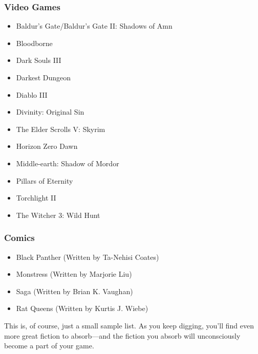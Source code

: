 \documentclass[10pt,a4paper,twoside,bg=print,twocolumn,openany,nodeprecatedcode]{dndbook}
\begin{document}
\subsubsection{Video Games}

\begin{itemize}
\item Baldur's Gate/Baldur's Gate II: Shadows of Amn
\item Bloodborne
\item Dark Souls III
\item Darkest Dungeon
\item Diablo III
\item Divinity: Original Sin
\item The Elder Scrolls V: Skyrim
\item Horizon Zero Dawn
\item Middle-earth: Shadow of Mordor
\item Pillars of Eternity
\item Torchlight II
\item The Witcher 3: Wild Hunt
\end{itemize}

\subsubsection{Comics}

\begin{itemize}
\item Black Panther (Written by Ta-Nehisi Coates)
\item Monstress (Written by Marjorie Liu)
\item Saga (Written by Brian K. Vaughan)
\item Rat Queens (Written by Kurtis J. Wiebe)
\end{itemize}

This is, of course, just a small sample list. As you keep digging, you'll find even more great fiction to absorb—and the fiction you absorb will unconsciously become a part of your game.
\end{document}
